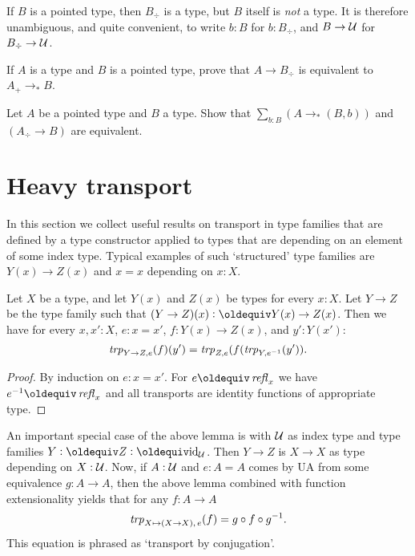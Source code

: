 If $B$ is a pointed type, then $B_\div $ is a type, but $B$ itself is
\emph{not} a type. It is therefore unambiguous, and quite convenient,
to write $b:B$ for $b:B_\div$, and $B\to\mathcal{U}$ for $B_\div\to\mathcal{U}$.

\begin{xca}\label{xca:plusforgetadjoint}
If $A$ is a type and $B$ is a pointed type, 
prove that $A\to B_\div$ is equivalent to $A_+\to_*B$.
\end{xca}

\begin{xca}\label{xca:freemaps}
  Let $A$ be a pointed type and $B$ a type.  Show that  
$\sum_{b:B}(A\to_*(B,b))$ and $(A_\div\to B)$ are equivalent.
\end{xca}


\section{Heavy transport}
\label{sec:heavy-transport}

In this section we collect useful results on transport in
type families that are defined by a type constructor applied
to types that are depending on an element of some index type.
Typical examples of such `structured' type families are 
$Y(x)\to Z(x)$ and $x=x$ depending on $x:X$.

\begin{lemma}\label{lem:trp-in-function-type}
Let $X$ be a type, and let $Y(x)$ and $Z(x)$ be types for every $x:X$.
Let $Y\to Z$ be the type family such that $(Y\to Z)(x) \defeq Y(x)\to Z(x)$.
Then we have for every $x,x':X$, $e: x=x'$, $f: Y(x)\to Z(x)$, and $y':Y(x')$:
\[
\mathop{\mathit{trp}_{Y\to Z, e}} (f)(y') = \mathop{\mathit{trp}_{Z,e}} (f(\mathop{\mathit{trp}_{Y, e^{-1}}}(y')).
\]
\end{lemma}
\begin{proof}
By induction on $e: x=x'$. For $e \jdeq \refl{x}$ we have $e^{-1}\jdeq \refl{x}$
and all transports are identity functions of appropriate type. 
\end{proof}

An important special case of the above lemma is with $\mathcal{U}$
as index type and type families $Y\defeq Z\defeq \id_\UU$.
Then $Y\to Z$ is $X\to X$ as type depending on $X:\mathcal{U}$. Now, 
if $A:\mathcal{U}$ and $e: A=A$ comes by UA from some equivalence 
$g:A\to A$, then the above lemma combined with function extensionality 
yields that for any $f: A\to A$
\[
\mathop{\mathit{trp}_{X\mapsto(X\to X),\,e}} (f) = g\circ f \circ g^{-1}.
\]
This equation is phrased as `transport by conjugation'.

